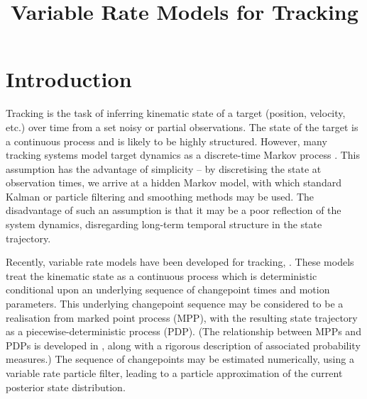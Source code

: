 \documentclass[conference]{IEEEtran}
\begin{document}
\title{Variable Rate Models for Tracking}

\author{
}

\maketitle



\begin{abstract}



\end{abstract}



\section{Introduction}

Tracking is the task of inferring kinematic state of a target (position, velocity, etc.) over time from a set noisy or partial observations. The state of the target is a continuous process and is likely to be highly structured. However, many tracking systems model target dynamics as a discrete-time Markov process \cite{Li2003}. This assumption has the advantage of simplicity -- by discretising the state at observation times, we arrive at a hidden Markov model, with which standard Kalman \cite{Anderson1979} or particle \cite{Cappe2007,Doucet2009} filtering and smoothing methods may be used. The disadvantage of such an assumption is that it may be a poor reflection of the system dynamics, disregarding long-term temporal structure in the state trajectory.

Recently, variable rate models have been developed for tracking, \cite{Godsill2007a,Godsill2007,Whiteley2011}. These models treat the kinematic state as a continuous process which is deterministic conditional upon an underlying sequence of changepoint times and motion parameters. This underlying changepoint sequence may be considered to be a realisation from marked point process (MPP), with the resulting state trajectory as a piecewise-deterministic process (PDP). (The relationship between MPPs and PDPs is developed in \cite{Jacobsen2006}, along with a rigorous description of associated probability measures.) The sequence of changepoints may be estimated numerically, using a variable rate particle filter, leading to a particle approximation of the current posterior state distribution.
\end{document}
